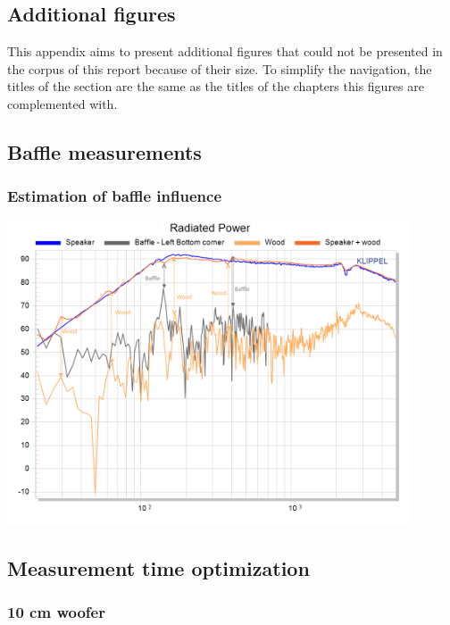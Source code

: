 \documentclass{report}
\begin{document}
\begin{appendices}

\chapter{Additional figures}
This appendix aims to present additional figures that could not be presented in the corpus of this report because of their size. To simplify the navigation, the titles of the section are the same as the titles of the chapters this figures are complemented with. 


\section{Baffle measurements}
\subsection{Estimation of baffle influence}
\label{Curves:BaffleInfluence}

\begin{center}
	\includegraphics[width=0.9\textwidth]{Appendix/Vib_RadPow}
    \captionsetup{hypcap=false}
    \label{Curves:Baffle_RadPow}
\end{center}


\section{Measurement time optimization}

\subsection{10 cm woofer}
\label{Curves:10cm}


\end{appendices}
\end{document}
